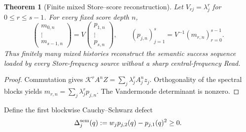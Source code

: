 \documentclass[11pt]{article}
\newtheorem{theorem}{Theorem}[section]
\theoremstyle{definition}
\theoremstyle{remark}
\begin{document}
\begin{theorem}[Finite mixed Store--score reconstruction]
\label{thm:mixed-score-reconstruction-master}
Let $V_{rj}=\lambda_j^r$ for $0\le r\le s-1$.  For every fixed score depth
$n$,
\begin{equation}
  \boxed{
  \begin{pmatrix}m_{0,n}\\ \vdots\\ m_{s-1,n}\end{pmatrix}
  =V
  \begin{pmatrix}p_{1,n}\\ \vdots\\ p_{s,n}\end{pmatrix},
  \qquad
  (p_{j,n})_{j=1}^{s}=V^{-1}(m_{r,n})_{r=0}^{s-1}.}
  \label{eq:mixed-score-Vandermonde-master}
\end{equation}
Thus finitely many mixed histories reconstruct the semantic success sequence
loaded by every Store-frequency source without a sharp central-frequency Read.
\end{theorem}

\begin{proof}
Commutation gives
$\mathscr K^rA^nZ=\sum_j\lambda_j^rA_j^nz_j$.  Orthogonality of the spectral
blocks yields
$m_{r,n}=\sum_j\lambda_j^rp_{j,n}$.  The Vandermonde determinant is nonzero.
\end{proof}

Define the first blockwise Cauchy--Schwarz defect
\begin{equation}
  \Delta_j^{\rm sem}(q)
  :=w_jp_{j,2}(q)-p_{j,1}(q)^2\ge0.
  \label{eq:semantic-block-defect-master}
\end{equation}
\end{document}
